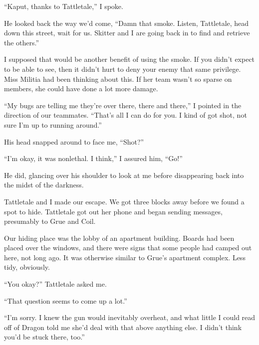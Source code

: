 ``Kaput, thanks to Tattletale,'' I spoke.



He looked back the way we'd come, ``Damn that smoke.  Listen, Tattletale, head down this street, wait for us.  Skitter and I are going back in to find and retrieve the others.''



I supposed that would be another benefit of using the smoke.  If you didn't expect to be able to see, then it didn't hurt to deny your enemy that same privilege.  Miss Militia had been thinking about this.  If her team wasn't so sparse on members, she could have done a lot more damage.



``My bugs are telling me they're over there, there and there,'' I pointed in the direction of our teammates.  ``That's all I can do for you.  I kind of got shot, not sure I'm up to running around.''



His head snapped around to face me, ``Shot?''



``I'm okay, it was nonlethal.  I think,'' I assured him, ``Go!''



He did, glancing over his shoulder to look at me before disappearing back into the midst of the darkness.



Tattletale and I made our escape.  We got three blocks away before we found a spot to hide.  Tattletale got out her phone and began sending messages, presumably to Grue and Coil.



Our hiding place was the lobby of an apartment building.  Boards had been placed over the windows, and there were signs that some people had camped out here, not long ago.  It was otherwise similar to Grue's apartment complex.  Less tidy, obviously.



``You okay?'' Tattletale asked me.



``That question seems to come up a lot.''



``I'm sorry.  I knew the gun would inevitably overheat, and what little I could read off of Dragon told me she'd deal with that above anything else.  I didn't think you'd be stuck there, too.''




